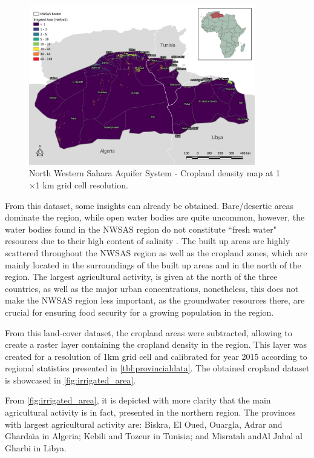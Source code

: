 \documentclass[12pt]{iopart}
\begin{document}
\begin{figure}[!t]
	\centering
	\includegraphics[width=0.88\textwidth, cfbox=black 1pt 0pt]{NWSAS_Irrigated_area}
	\caption[NWSAS cropland density map]{North Western Sahara Aquifer System - Cropland density map at 1$\times$1 km grid cell resolution.}
	\label{fig:irrigated_area}
\end{figure}

From this dataset, some insights can already be obtained. Bare/desertic areas dominate the region, while open water bodies are quite uncommon, however, the water bodies found in the NWSAS region do not constitute ``fresh water" resources due to their high content of salinity \cite{CHAOUKI20131043}. The built up areas are highly scattered throughout the NWSAS region as well as the cropland zones, which are mainly located in the surroundings of the built up areas and in the north of the region. The largest agricultural activity, is given at the north of the three countries, as well as the major urban concentrations, nonetheless, this does not make the NWSAS region less important, as the groundwater resources there, are crucial for ensuring food security for a growing population in the region.

From this land-cover dataset, the cropland areas were subtracted, allowing to create a raster layer containing the cropland density in the region. This layer was created for a resolution of 1km grid cell and calibrated for year 2015 according to regional statistics presented in \autoref{tbl:provincialdata}. The obtained cropland dataset is showcased in \autoref{fig:irrigated_area}.

From \autoref{fig:irrigated_area}, it is depicted with more clarity that the main agricultural activity is in fact, presented in the northern region. The provinces with largest agricultural activity are: Biskra, El Oued, Ouargla, Adrar and Gharda\"\i a in Algeria; Kebili and Tozeur in Tunisia; and Misratah andAl Jabal al Gharbi in Libya.
\end{document}
